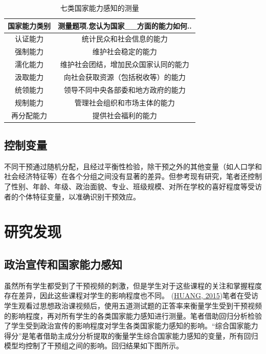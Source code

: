 \documentclass[
  12pt,
]{ctexart}
\begin{document}
\begin{table}[!h]

\caption{\label{tab:unnamed-chunk-5}七类国家能力感知的测量}
\centering
\begin{tabular}[t]{cc}
\toprule
国家能力类别 & 测量题项.您认为国家\_\_方面的能力如何..\\
\midrule
认证能力 & 统计民众和社会信息的能力\\
强制能力 & 维护社会稳定的能力\\
濡化能力 & 维护社会团结，增加民众国家认同的能力\\
汲取能力 & 向社会获取资源（包括税收等）的能力\\
统领能力 & 领导不同中央各部委和地方政府的能力\\
\addlinespace
规制能力 & 管理社会组织和市场主体的能力\\
再分配能力 & 提供社会福利的能力\\
\bottomrule
\end{tabular}
\end{table}

\hypertarget{ux63a7ux5236ux53d8ux91cf}{%
\subsection{控制变量}\label{ux63a7ux5236ux53d8ux91cf}}

不同干预通过随机分配，且经过平衡性检验，除干预之外的其他变量（如人口学和社会经济特征等）在各个分组之间没有显著的差异。但参考现有研究，笔者还控制了性别、年龄、年级、政治面貌、专业、班级规模、对所在学校的喜好程度等受访者的个体特征变量，以准确识别干预效应。

\hypertarget{ux7814ux7a76ux53d1ux73b0}{%
\section{研究发现}\label{ux7814ux7a76ux53d1ux73b0}}

\hypertarget{ux653fux6cbbux5ba3ux4f20ux548cux56fdux5bb6ux80fdux529bux611fux77e5}{%
\subsection{政治宣传和国家能力感知}\label{ux653fux6cbbux5ba3ux4f20ux548cux56fdux5bb6ux80fdux529bux611fux77e5}}

虽然所有学生都受到了干预视频的刺激，但是学生对于这些课程的关注和掌握程度存在差异，因此这些课程对学生的影响程度也不同。 (\protect\hyperlink{ref-Huang2015a}{HUANG, 2015})笔者在受访学生观看过思想政治课视频后，使用五道测试题的正答率来衡量学生受到干预视频的影响程度，再对所有学生的各类国家能力感知进行测量。笔者借助回归分析检验了学生受到政治宣传的影响程度对学生各类国家能力感知的影响。``综合国家能力得分''是笔者借助主成分分析提取的衡量学生综合国家能力感知的变量，所有回归模型均控制了干预组之间的影响。回归结果如下图所示。
\end{document}
